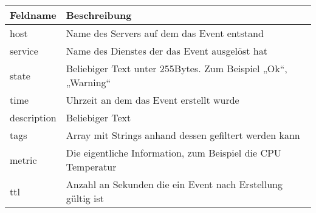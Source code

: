 \begin{center}
  \label{tbl:riemann}
  \begin{tabular}{ll}
  \toprule
  Feldname    & Beschreibung                                                 \\
  \midrule
  host        & Name des Servers auf dem das Event entstand                  \\
  service     & Name des Dienstes der das Event ausgelöst hat                \\
  state       & Beliebiger Text unter 255Bytes. Zum Beispiel „Ok“, „Warning“ \\
  time        & Uhrzeit an dem das Event erstellt wurde                      \\
  description & Beliebiger Text                                              \\
  tags        & Array mit Strings anhand dessen gefiltert werden kann        \\
  metric      & Die eigentliche Information, zum Beispiel die CPU Temperatur \\
  ttl         & Anzahl an Sekunden die ein Event nach Erstellung gültig ist  \\
  \bottomrule
\end{tabular}
\end{center}
